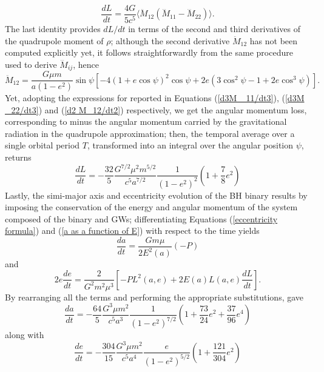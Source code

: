 \begin{equation}
    \frac{dL}{dt}=\frac{4G}{5c^5}\langle \ddot{M}_{12}(\dddot{M}_{11}-\dddot{M}_{22})\rangle.
\end{equation}
The last identity provides $dL/dt$ in terms of the second and third derivatives of the quadrupole moment of $\rho$; although the second derivative $\ddot{M}_{12}$ has not been computed explicitly yet, it follows straightforwardly from the same procedure used to derive $\dddot{M}_{ij}$, hence
\begin{equation}\label{d2 M_12/dt2}
\ddot{M}_{12}
=
\frac{G \mu m}{a(1 - e^2)} \sin \psi
\left[
-4(1 + e \cos \psi)^2 \cos \psi
+ 2e \left( 3 \cos^2 \psi - 1 + 2e \cos^3 \psi \right)
\right].
\end{equation}
Yet, adopting the expressions for reported in Equations (\ref{d3M _11/dt3}), (\ref{d3M _22/dt3}) and (\ref{d2 M_12/dt2}) respectively, we get the angular momentum loss, corresponding to minus the angular momentum carried by the gravitational radiation in the quadrupole approximation; then, the temporal average over a single orbital period $T$, transformed into an integral over the angular position $\psi$, returns
\begin{equation}
    \frac{dL}{dt}=-\frac{32}{5}\frac{G^{7/2}\mu^2m^{5/2}}{c^5a^{7/2}}\frac{1}{(1-e^2)^2}\left(1+\frac{7}{8}e^2\right)
\end{equation}
Lastly, the simi-major axis and eccentricity evolution of the BH binary results by imposing the conservation of the energy and angular momentum of the system composed of the binary and GWs; differentiating Equations (\ref{eccentricity formula}) and (\ref{a as a function of E}) with respect to the time yields
\begin{equation}
    \frac{da}{dt}=\frac{Gm\mu}{2E^2(a)}(-P)
\end{equation}
and
\begin{equation}
    2e\frac{de}{dt}=\frac{2}{G^2m^2\mu^3}\left[-PL^2(a,e)+2E(a)L(a,e)\frac{dL}{dt}\right].
\end{equation}
By rearranging all the terms and performing the appropriate substitutions, \textcite{Peters_1963} gave 
\begin{equation}\label{da/dt Peterson}
    \frac{da}{dt} = -\frac{64}{5} \frac{G^3 \mu m^2}{c^5 a^3} \frac{1}{(1 - e^2)^{7/2}} \left( 1 + \frac{73}{24}e^2 + \frac{37}{96}e^4 \right)
\end{equation}
along with
\begin{equation}\label{de/dt Peterson}
    \frac{de}{dt} = -\frac{304}{15} \frac{G^3 \mu m^2}{c^5 a^4}  \frac{e}{(1 - e^2)^{5/2}} \left( 1 + \frac{121}{304}e^2 \right)
\end{equation}
